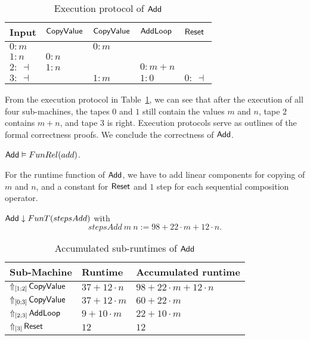 \begin{table}[h]
  \centering
  \begin{tabular}{l||l|l|l|l}
    Input       & $\MS{CopyValue}$ & $\MS{CopyValue}$ & $\MS{AddLoop}$ & $\MS{Reset}$ \\ \hline
    $0: m$      &                  & $0 : m$          &                &              \\
    $1: n$      & $0 : n$          &                  &                &              \\
    $2:~\dashv$ & $1 : n$          &                  & $0: m+n$       &              \\
    $3:~\dashv$ &                  & $1 : m$          & $1: 0$         & $0:~ \dashv$ \\
  \end{tabular}
  \caption{Execution protocol of $\MS{Add}$}
  \label{tab:exec-Add}
\end{table}

From the execution protocol in Table~\ref{tab:exec-Add}, we can see that after the execution of all four sub-machines, the tapes $0$ and $1$ still
contain the values $m$ and $n$, tape $2$ contains $m+n$, and tape $3$ is right.  Execution protocols serve as outlines of the formal correctness
proofs.  We conclude the correctness of $\MS{Add}$.
\begin{lemma}
  \label{lem:Add_Computes}
  $\MS{Add} \Realise FunRel(add)$.
\end{lemma}

For the runtime function of $\MS{Add}$, we have to add linear components for copying of $m$ and $n$, and a constant for $\MS{Reset}$ and $1$ step for
each sequential composition operator.
\begin{lemma}
  $\MS{Add} \downarrow FunT(stepsAdd)$ with
  \[
    stepsAdd~m~n := 98 + 22 \cdot m + 12 \cdot n.
  \]
\end{lemma}

\begin{table}[h]
  \centering
  \begin{tabular}{l|l|l}
    Sub-Machine & Runtime & Accumulated runtime \\ \hline
    $\LiftTapes{\MS{CopyValue}}{\Vector{1;2}}$  & $37 + 12 \cdot n$ & $98 + 22 \cdot m + 12 \cdot n$ \\
    $\LiftTapes{\MS{CopyValue}}{\Vector{0;3}}$  & $37 + 12 \cdot m$ & $60 + 22 \cdot m$ \\
    $\LiftTapes{\MS{AddLoop}}{\Vector{2;3}}$    & $9 + 10 \cdot m$  & $22 + 10 \cdot m$ \\
    $\LiftTapes{\MS{Reset}}{\Vector{3}}$        & $12$              & $12$ \\
  \end{tabular}
  \caption{Accumulated sub-runtimes of $\MS{Add}$}
  \label{tab:runtime-Add}
\end{table}

